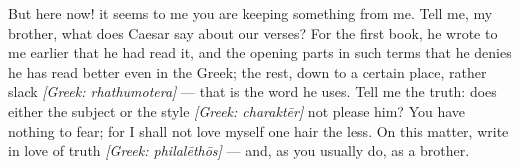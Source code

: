  But here now! it seems to me you are keeping something from me. Tell me, my brother, what does Caesar say about our verses? For the first book, he wrote to me earlier that he had read it, and the opening parts in such terms that he denies he has read better even in the Greek; the rest, down to a certain place, rather slack \textit{[Greek: rhathumotera]} --- that is the word he uses. Tell me the truth: does either the subject or the style \textit{[Greek: charaktēr]} not please him? You have nothing to fear; for I shall not love myself one hair the less. On this matter, write in love of truth \textit{[Greek: philalēthōs]} --- and, as you usually do, as a brother.

